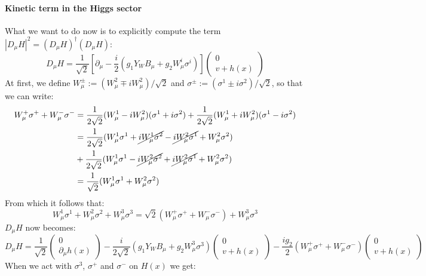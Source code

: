 \documentclass[../main.tex]{subfiles}
\begin{document}
\paragraph{Kinetic term in the Higgs sector} What we want to do now is to explicitly compute the term $|D_\mu H|^2=(D_\mu H)^\dagger(D_\mu H)$:
\[
D_\mu H=\frac{1}{\sqrt{2}}\left[\partial_\mu-\frac{i}{2}(g_1Y_WB_\mu+g_2W_\mu^i\sigma^i)\right]\begin{pmatrix}0 \\ v+h(x)\end{pmatrix}
\]
At first, we define $W_\mu^\pm:=(W_\mu^2\mp iW_\mu^2)/\sqrt{2}$ and $\sigma^\pm:=(\sigma^1\pm i\sigma^2)/\sqrt{2}$, so that we can write:
\begin{align*}
W_\mu^+\sigma^++W_\mu^-\sigma^-&=\frac{1}{2\sqrt{2}}(W_\mu^1-iW_\mu^2)(\sigma^1+i\sigma^2)+\frac{1}{2\sqrt{2}}(W_\mu^1+iW_\mu^2)(\sigma^1-i\sigma^2)\\
&=\frac{1}{2\sqrt{2}}(W_\mu^1\sigma^1+\cancel{iW_\mu^1\sigma^2}-\cancel{iW_\mu^2\sigma^1}+W_\mu^2\sigma^2)\\
&+\frac{1}{2\sqrt{2}}(W_\mu^1\sigma^1-\cancel{iW_\mu^2\sigma^2}+\cancel{iW_\mu^2\sigma^1}+W_\mu^2\sigma^2)\\
&=\frac{1}{\sqrt{2}}(W_\mu^1\sigma^1+W_\mu^2\sigma^2)
\end{align*}
From which it follows that:
\[
W_\mu^1\sigma^1+W_\mu^2\sigma^2+W_\mu^3\sigma^3=\sqrt{2}(W_\mu^+\sigma^++W_\mu^-\sigma^-)+W_\mu^3\sigma^3
\]
$D_\mu H$ now becomes:
\[
D_\mu H=\frac{1}{\sqrt{2}}\begin{pmatrix}0 \\ \partial_\mu h(x)\end{pmatrix}-\frac{i}{2\sqrt{2}}(g_1Y_WB_\mu+g_2W_\mu^3\sigma^3)\begin{pmatrix}0 \\ v+h(x)\end{pmatrix}-\frac{ig_2}{2}(W_\mu^+\sigma^++W_\mu^-\sigma^-)\begin{pmatrix}0 \\ v+h(x)\end{pmatrix}
\]
When we act with $\sigma^3$, $\sigma^+$ and $\sigma^-$ on $H(x)$ we get:
\end{document}
